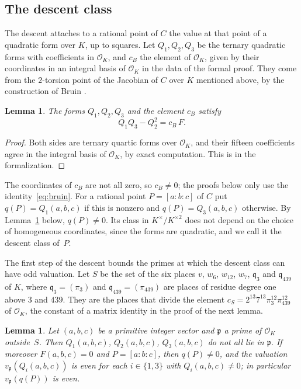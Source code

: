 \documentclass[11pt]{amsart}
\newtheorem{lemma}[theorem]{Lemma}
\theoremstyle{definition}
\numberwithin{equation}{section}
\newcommand{\OK}{\mathcal{O}_K}
\newcommand{\sq}[1]{#1^{\times}/#1^{\times 2}}
\newcommand{\lean}[1]{\ignorespaces}
\begin{document}
\subsection{The descent class}\label{sec:descent-class}

The descent attaches to a rational point of $C$ the value at that point of a quadratic form over $K$, up to squares. Let $Q_1,Q_2,Q_3$ be the ternary quadratic forms with coefficients in $\OK$, and $c_B$ the element of $\OK$, given by their coordinates in an integral basis of $\OK$ in the data of the formal proof. They come from the $2$-torsion point of the Jacobian of $C$ over $K$ mentioned above, by the construction of Bruin \cite[Lemma~3.3 and Section~5, Case~4]{Bruin08}.

\begin{lemma}\label{lem:bruin-identity}\lean{FurioLombardo.M1.bruin_O}
The forms $Q_1,Q_2,Q_3$ and the element $c_B$ satisfy
\begin{equation}\label{eq:bruin}
Q_1Q_3-Q_2^2=c_B\,F .
\end{equation}
\end{lemma}

\begin{proof}
Both sides are ternary quartic forms over $\OK$, and their fifteen coefficients agree in the integral basis of $\OK$, by exact computation. This is  in the formalization.
\end{proof}

The coordinates of $c_B$ are not all zero, so $c_B\neq0$; the proofs below only use the identity~\eqref{eq:bruin}. For a rational point $P=[a:b:c]$ of $C$ put $q(P)=Q_1(a,b,c)$ if this is nonzero and $q(P)=Q_3(a,b,c)$ otherwise. By Lemma~\ref{lem:support} below, $q(P)\neq0$. Its class in $\sq{K}$ does not depend on the choice of homogeneous coordinates, since the forms are quadratic, and we call it the descent class of~$P$.

The first step of the descent bounds the primes at which the descent class can have odd valuation. Let $S$ be the set of the six places $v$, $w_6$, $w_{12}$, $w_7$, $\mathfrak q_3$ and $\mathfrak q_{439}$ of $K$, where $\mathfrak q_3=(\pi_3)$ and $\mathfrak q_{439}=(\pi_{439})$ are places of residue degree one above $3$ and $439$. They are the places that divide the element $c_S=2^{13}7^{13}\pi_3^{12}\pi_{439}^{12}$ of $\OK$, the constant of a matrix identity in the proof of the next lemma.

\begin{lemma}\label{lem:support}\lean{FurioLombardo.M1.not_all_mem, FurioLombardo.M1.exists_qO_ne_zero, FurioLombardo.M1.mem_selmer_of_qO}
Let $(a,b,c)$ be a primitive integer vector and $\mathfrak p$ a prime of $\OK$ outside~$S$. Then $Q_1(a,b,c)$, $Q_2(a,b,c)$, $Q_3(a,b,c)$ do not all lie in $\mathfrak p$. If moreover $F(a,b,c)=0$ and $P=[a:b:c]$, then $q(P)\neq0$, and the valuation $v_{\mathfrak p}(Q_i(a,b,c))$ is even for each $i\in\{1,3\}$ with $Q_i(a,b,c)\neq0$; in particular $v_{\mathfrak p}(q(P))$ is even.
\end{lemma}
\end{document}

